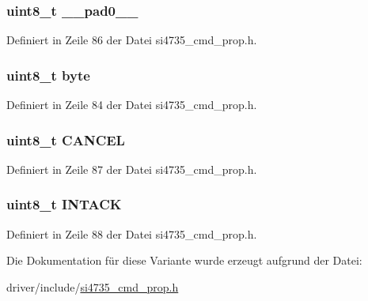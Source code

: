 \subsubsection[{\+\_\+\+\_\+pad0\+\_\+\+\_\+}]{\setlength{\rightskip}{0pt plus 5cm}uint8\+\_\+t \+\_\+\+\_\+pad0\+\_\+\+\_\+}\label{unionfm__tune__status__arg1_a8b4eebe79ded0459acec2f4950102ba3}


Definiert in Zeile 86 der Datei si4735\+\_\+cmd\+\_\+prop.\+h.

\hypertarget{unionfm__tune__status__arg1_a96f44d20f1dbf1c8785a7bc99a46164c}{}
\subsubsection[{byte}]{\setlength{\rightskip}{0pt plus 5cm}uint8\+\_\+t byte}\label{unionfm__tune__status__arg1_a96f44d20f1dbf1c8785a7bc99a46164c}


Definiert in Zeile 84 der Datei si4735\+\_\+cmd\+\_\+prop.\+h.

\hypertarget{unionfm__tune__status__arg1_ac030f6cac29ec43cc0457a01f7ea9f93}{}
\subsubsection[{C\+A\+N\+C\+E\+L}]{\setlength{\rightskip}{0pt plus 5cm}uint8\+\_\+t C\+A\+N\+C\+E\+L}\label{unionfm__tune__status__arg1_ac030f6cac29ec43cc0457a01f7ea9f93}


Definiert in Zeile 87 der Datei si4735\+\_\+cmd\+\_\+prop.\+h.

\hypertarget{unionfm__tune__status__arg1_adf4f80d8fb205d6c93c6423d84d63d9c}{}
\subsubsection[{I\+N\+T\+A\+C\+K}]{\setlength{\rightskip}{0pt plus 5cm}uint8\+\_\+t I\+N\+T\+A\+C\+K}\label{unionfm__tune__status__arg1_adf4f80d8fb205d6c93c6423d84d63d9c}


Definiert in Zeile 88 der Datei si4735\+\_\+cmd\+\_\+prop.\+h.



Die Dokumentation für diese Variante wurde erzeugt aufgrund der Datei\+:\begin{DoxyCompactItemize}
\item 
driver/include/\hyperlink{si4735__cmd__prop_8h}{si4735\+\_\+cmd\+\_\+prop.\+h}\end{DoxyCompactItemize}
